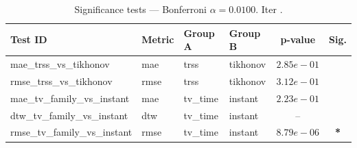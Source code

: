 ﻿%
\begin{table}[ht]
\centering
\caption[EEG reconstruction - Iteration it28]{Significance tests — Bonferroni $\alpha=0.0100$. Iter .}
\label{tab:sig_it28_nnk_3syn}
\small
\begin{tabular}{llllcc}
\toprule
Test ID & Metric & Group A & Group B & p-value & Sig. \\
\midrule
mae\_trss\_vs\_tikhonov & mae & trss & tikhonov & $2.85e-01$ &  \\
rmse\_trss\_vs\_tikhonov & rmse & trss & tikhonov & $3.12e-01$ &  \\
mae\_tv\_family\_vs\_instant & mae & tv\_time & instant & $2.23e-01$ &  \\
dtw\_tv\_family\_vs\_instant & dtw & tv\_time & instant & -- &  \\
rmse\_tv\_family\_vs\_instant & rmse & tv\_time & instant & $8.79e-06$ & \textbf{*} \\
\bottomrule
\end{tabular}
\end{table}







